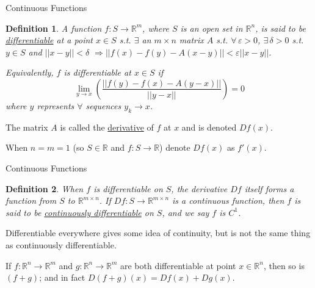 \documentclass[xcolor=dvipsnames, compress, t]{beamer}
\newtheorem{defin}{Definition}
\newcommand{\vs}{\vspace{\baselineskip}}
\begin{document}
\begin{frame}{Continuous Functions}

\begin{defin}
A function $f:S \rightarrow \mathds{R}^m$, where $S$ is an open set in $\mathds{R}^n$, is said to be \underline{differentiable} at a point $x\in S$ s.t. $\exists$ an $m \times n$ matrix $A$ s.t. $\forall\, \varepsilon >0$, $\exists \, \delta > 0$ s.t. $y\in S$ and $||x-y||< \delta$  \tabto{2cm}$\Rightarrow ||f(x) - f(y) - A(x-y)|| < \varepsilon ||x - y||$.

\vs Equivalently, $f$ is differentiable at $x \in S$ if $$\lim_{y\rightarrow x} \left( \frac{||f(y) - f(x) - A(y-x)||}{||y-x||}\right) = 0$$
where $y$ represents $\forall$ sequences $y_k \rightarrow x$.
\end{defin}

The matrix $A$ is called the \underline{derivative} of $f$ at $x$ and is denoted $D f(x)$.

\vs When $n = m = 1$ (so $S\in \mathds{R}$ and $f:S \rightarrow \mathds{R}$) denote $Df(x)$ as $f'(x)$.

\end{frame}


\begin{frame}{Continuous Functions}

\begin{defin}
When $f$ is differentiable on $S$, the derivative $D f$ itself forms a function from $S$ to $\mathds{R}^{m\times n}$. If $D f: S \rightarrow \mathds{R}^{m\times n}$ is a continuous function, then $f$ is said to be \underline{continuously differentiable} on $S$, and we say $f$ is $C^1$.
\end{defin}

Differentiable everywhere gives some idea of continuity, but is not the same thing as continuously differentiable. \pause

\begin{theorem}
If $f:\mathds{R}^n \rightarrow \mathds{R}^m$ and $g:\mathds{R}^n \rightarrow \mathds{R}^m$ are both differentiable at point $x \in \mathds{R}^n$, then so is $(f+g)$; and in fact $D(f+g)(x) = D f(x) + Dg(x)$.
\end{theorem}

\end{frame}
\end{document}

